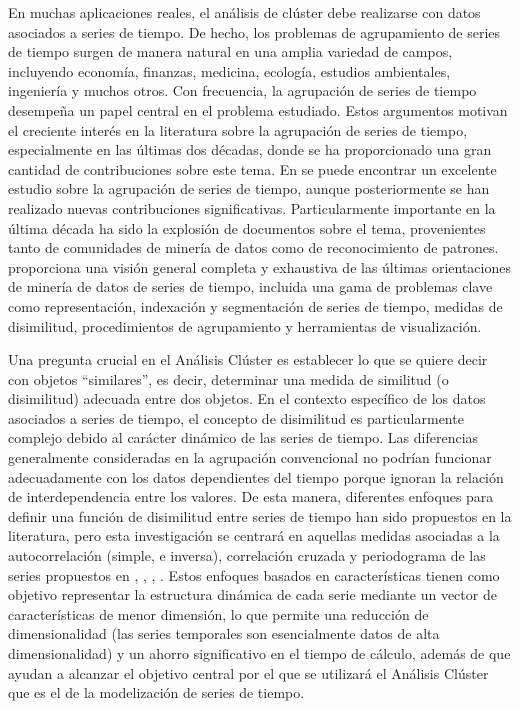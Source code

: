 \documentclass[12pt,oneside]{book}\usepackage[]{graphicx}\usepackage[]{color}
\theoremstyle{definition} %
\begin{document}
En muchas aplicaciones reales, el análisis de clúster debe realizarse con datos asociados a series de tiempo. 
De hecho, los problemas de agrupamiento de series de tiempo surgen de manera natural en una amplia variedad de campos, incluyendo economía, finanzas, medicina, ecología, estudios ambientales, ingeniería y muchos otros. Con frecuencia, la agrupación de series de tiempo desempeña un papel central en el problema estudiado. Estos argumentos motivan el creciente interés en la literatura sobre la agrupación de series de tiempo, especialmente en las últimas dos décadas, donde se ha proporcionado una gran cantidad de contribuciones sobre este tema. En  \citeauthor{liao2005clustering} \citeyear{liao2005clustering} se puede encontrar un excelente estudio sobre la agrupación de series de tiempo, aunque posteriormente se han realizado nuevas contribuciones significativas. 
Particularmente importante en la última década ha sido la explosión de documentos sobre el tema, provenientes tanto de comunidades de minería de datos como de reconocimiento de patrones. \citeauthor{fu2011review} \citeyear{fu2011review} proporciona una visión general completa y exhaustiva de las últimas orientaciones de minería de datos de series de tiempo, incluida una gama de problemas clave como representación, indexación y segmentación de series de tiempo, medidas de disimilitud, procedimientos de agrupamiento y herramientas de visualización.


Una pregunta crucial en el Análisis Clúster es establecer lo que se quiere decir con objetos ``similares'', es decir, determinar una medida de similitud (o disimilitud) adecuada entre dos objetos. En el contexto específico de los datos asociados a series de tiempo, el concepto de disimilitud es particularmente complejo debido al carácter dinámico de las series de tiempo. Las diferencias generalmente consideradas en la agrupación convencional no podrían funcionar adecuadamente con los datos dependientes del tiempo porque ignoran la relación de interdependencia entre los valores. De esta manera, diferentes enfoques para definir una función de disimilitud entre series de tiempo han sido propuestos en la literatura, pero esta investigación se centrará en aquellas medidas asociadas a la autocorrelación (simple, e inversa), correlación cruzada y periodograma de las series propuestos en \citeauthor{struzik1999haar} \citeyear{struzik1999haar}, \citeauthor{galeano2000multivariate} \citeyear{galeano2000multivariate}, \citeauthor{caiado2006periodogram} \citeyear{caiado2006periodogram}, \citeauthor{chouakria2007adaptive} \citeyear{chouakria2007adaptive} . Estos enfoques basados en características tienen como objetivo representar la estructura dinámica de cada serie mediante un vector de características de menor dimensión, lo que permite una reducción de dimensionalidad (las series temporales son esencialmente datos de alta dimensionalidad) y un ahorro significativo en el tiempo de cálculo, además de que ayudan a alcanzar el objetivo central por el que se utilizará el Análisis Clúster que es el de la modelización de series de tiempo.
\end{document}
